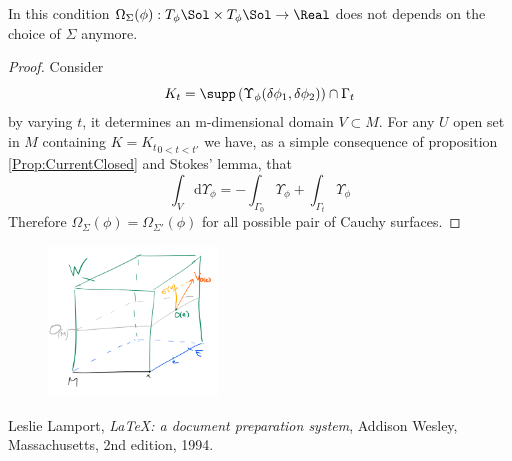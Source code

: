 \documentclass[a4paper,12pt]{scrartcl}  %
\begin{document}
\begin{proposition}
	In this condition $\Omega_\Sigma (\phi): T_\phi \Sol \times T_\phi \Sol \rightarrow \Real$ does not depends on the choice of $\Sigma$ anymore.
\end{proposition}
\begin{proof}
	Consider 
	\begin{displaymath}
		K_t = \supp\left(\Upsilon_\phi (\delta \phi_1, \delta \phi_2) \right) \cap \Gamma_t
	\end{displaymath}
	by varying $t$, it determines an m-dimensional domain $V \subset M$.
	For any $U$ open set in $M$ containing $K={K_t}_{0<t<t'}$ we have, as a simple consequence of proposition \ref{Prop:CurrentClosed} and Stokes' lemma, that
	\begin{displaymath}
		\int_V \textrm{d} \Upsilon_\phi = - \int_{\Gamma_0} \Upsilon_\phi +\int_{\Gamma_t} \Upsilon_\phi 
	\end{displaymath}
	Therefore $\Omega_\Sigma (\phi) = \Omega_{\Sigma'} (\phi)$ for all possible pair of Cauchy surfaces.
\end{proof}





\begin{figure}
\centering
\includegraphics[width=0.40\textwidth]{Pictures/sigma.png}
\end{figure}








\begin{thebibliography}{9}

  Leslie Lamport,
  \emph{\LaTeX: a document preparation system},
  Addison Wesley, Massachusetts,
  2nd edition,
  1994.

\end{thebibliography}
\end{document}
